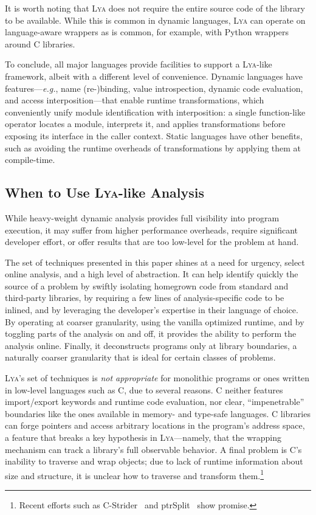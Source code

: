 \documentclass[letterpaper,twocolumn,10pt]{article}
\def\eg{{\em e.g.}, }
\newcommand{\sys}{{\scshape Lya}\xspace}
\begin{document}
It is worth noting that \sys does not require the entire source code of the library to be available.
While this is common in dynamic languages, \sys can operate on language-aware wrappers as is common, for example, with Python wrappers around C libraries.

To conclude, all major languages provide facilities to support a \sys-like framework, albeit with a different level of convenience.
Dynamic languages have features---\eg name (re-)binding, value introspection, dynamic code evaluation, and access interposition---that enable runtime transformations, which conveniently unify module identification with interposition:
  a single function-like operator locates a module, interprets it, and applies transformations before exposing its interface in the caller context.
Static languages have other benefits, such as avoiding the runtime overheads of transformations by applying them at compile-time.


\subsection{When to Use \sys-like Analysis}
\label{principles}
While heavy-weight dynamic analysis provides full visibility into program execution, it may suffer from higher performance overheads, require significant developer effort, or offer results that are too low-level for the problem at hand.

The set of techniques presented in this paper shines at a need for urgency, select online analysis, and a high level of abstraction.
It can help identify quickly the source of a problem by swiftly isolating homegrown code from standard and third-party libraries, by requiring a few lines of analysis-specific code to be inlined, and by leveraging the developer's expertise in their language of choice.
By operating at coarser granularity, using the vanilla optimized runtime, and by toggling parts of the analysis on and off, it provides the ability to perform the analysis online.
Finally, it deconstructs programs only at library boundaries, a naturally coarser granularity that is ideal for certain classes of problems.

\sys's set of techniques is \emph{not appropriate} for monolithic programs or ones written in low-level languages such as C, due to several reasons.
C neither features import/export keywords and runtime code evaluation,
  nor clear, ``impenetrable'' boundaries like the ones available in memory- and type-safe languages.
C libraries can forge pointers and access arbitrary locations in the program's address space, a feature that breaks a key hypothesis in \sys---namely, that the wrapping mechanism can track a library's full observable behavior.
A final problem is C's inability to traverse and wrap objects;
  due to lack of runtime information about size and structure, it is unclear how to traverse and transform them.\footnote{
  Recent efforts such as C-Strider~\cite{saur2016cstrider} and ptrSplit~\cite{ptrsplit:17} show promise.
}
\end{document}
